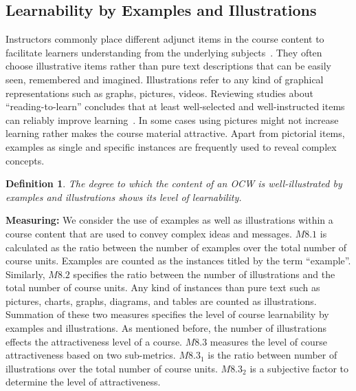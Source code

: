 \documentclass{sig-alternate}
\theoremstyle{definition}
\newtheorem{defn}{Definition}
\begin{document}
\subsection{Learnability by Examples and Illustrations}
\label{sec:illustration}
Instructors commonly place different adjunct items in the course content to facilitate learners understanding from the underlying subjects~\parencite{Hayes.1983}.
They often choose illustrative items rather than pure text descriptions that can be easily seen, remembered and imagined.
Illustrations refer to any kind of graphical representations such as graphs, pictures, videos.
Reviewing studies about ``reading-to-learn'' concludes that at least well-selected and well-instructed items can reliably improve learning~\parencite{Carney.2002}.
In some cases using pictures might not increase learning rather makes the course material attractive.
Apart from pictorial items, examples as single and specific instances are frequently used to reveal complex concepts.

\begin{defn}
\emph {The degree to which the content of an OCW is well-illustrated by examples and illustrations shows its level of learnability.}
\end{defn}

\noindent\textbf{Measuring:}
We consider the use of examples as well as illustrations within a course content that are used to convey complex ideas and messages.
$M8.1$ is calculated as the ratio between the number of examples over the total number of course units.
Examples are counted as the instances titled by the term ``example''.
Similarly, $M8.2$ specifies the ratio between the number of illustrations and the total number of course units.
Any kind of instances than pure text such as pictures, charts, graphs, diagrams, and tables are counted as illustrations.
Summation of these two measures specifies the level of course learnability by examples and illustrations.
As mentioned before, the number of illustrations effects the attractiveness level of a course.
$M8.3$ measures the level of course attractiveness based on two sub-metrics.
$M8.3_1$ is the ratio between number of illustrations over the total number of course units.
$M8.3_2$ is a subjective factor to determine the level of attractiveness.  
\end{document}
